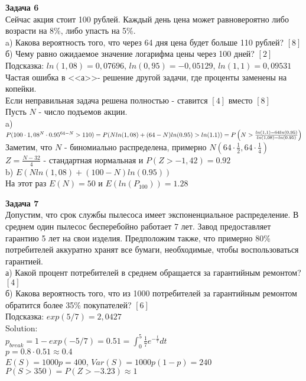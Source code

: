 \documentclass[pdftex,12pt,a4paper]{article}
\begin{document}
\textbf{Задача 6} \\ %
Сейчас акция стоит 100 рублей. Каждый день цена может равновероятно либо возрасти на 8\%, либо упасть на 5\%. \\
a) Какова вероятность того, что через 64 дня цена будет больше 110 рублей? $[8]$ \\
б) Чему равно ожидаемое значение логарифма цены через 100 дней? $[2]$ \\
Подсказка: $ln(1,08)=0,07696$, $ln(0,95)=-0,05129$, $ln(1,1)=0,09531$ \\
Частая ошибка в <<а>>- решение другой задачи, где проценты заменены на копейки. \\
Если неправильная задача решена полностью - ставится $[4]$ вместо $[8]$ \\
Пусть $N$ - число подъемов акции. \\
a) $P(100\cdot 1,08^N\cdot 0.95^{64-N}>110)=\\
P(Nln(1,08)+(64-N)ln(0.95)>ln(1.1))=\\
P\left(N>\frac{ln(1,1)-64ln(0,95)}{ln(1,08)-ln(0.95)}\right)$\\
Заметим, что $N$ - биномиально распределена, примерно $N(64\cdot\frac{1}{2},64\cdot\frac{1}{4})$\\
$Z=\frac{N-32}{4}$ - стандартная нормальная и $P(Z>-1,42)=0.92$ \\
b) $E(Nln(1,08)+(100-N)ln(0.95))$ \\
На этот раз $E(N)=50$ и $E(ln(P_{100}))=1.28$ \\

\newpage

\textbf{Задача 7} \\ 
Допустим, что срок службы пылесоса имеет экспоненциальное распределение. В среднем один пылесос бесперебойно работает 7 лет. Завод предоставляет гарантию 5 лет на свои изделия. Предположим также, что примерно 80\% потребителей аккуратно хранят все бумаги, необходимые, чтобы воспользоваться гарантией. \\
а) Какой процент потребителей в среднем обращается за гарантийным ремонтом? $[4]$ \\
б) Какова вероятность того, что из 1000 потребителей за гарантийным ремонтом обратится более 35\% покупателей? $[6]$ \\
Подсказка: $exp(5/7)=2,0427$ \\
Solution: \\
$p_{break}=1-exp(-5/7)=0.51=\int_{0}^{5}\frac{1}{7}e^{-\frac{t}{7}}dt$ \\
$p=0.8\cdot 0.51\approx 0.4$ \\
$E(S)=1000p=400$, $Var(S)=1000p(1-p)=240$ \\
$P(S>350)=P(Z>-3.23)\approx 1$ \\
\end{document}
